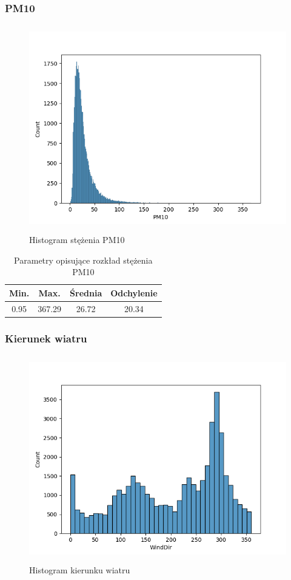 \documentclass[18pt, letterpaper]{article}
\begin{document}
\subsubsection{PM10}
\begin{figure}[H]
\centering
\includegraphics[width=120mm, height=90mm]{visualisations/histograms/PM10_hist.png}
\caption{Histogram stężenia PM10}
\end{figure}
\begin{table}[H]
\centering
\begin{tabular}{|c|c|c|c|}
\hline
Min.  & Max. & Średnia & Odchylenie \\ \hline
0.95 & 367.29 & 26.72   & 20.34      \\ \hline
\end{tabular}
\caption{Parametry opisujące rozkład stężenia PM10}
\end{table}

\subsubsection{Kierunek wiatru}
\begin{figure}[H]
\centering
\includegraphics[width=120mm, height=90mm]{visualisations/histograms/WindDir_hist.png}
\caption{Histogram kierunku wiatru}
\end{figure}
\end{document}
